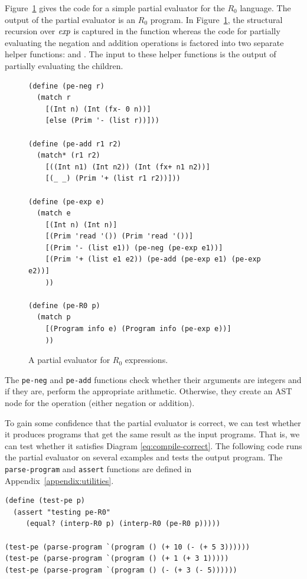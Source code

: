 \documentclass[11pt]{book}
\begin{document}
Figure~\ref{fig:pe-arith} gives the code for a simple partial
evaluator for the $R_0$ language. The output of the partial evaluator
is an $R_0$ program. In Figure~\ref{fig:pe-arith}, the structural
recursion over $\mathit{exp}$ is captured in the  function
whereas the code for partially evaluating the negation and addition
operations is factored into two separate helper functions:
 and . The input to these helper
functions is the output of partially evaluating the children.

\begin{figure}[tbp]
\begin{lstlisting}
(define (pe-neg r)
  (match r
    [(Int n) (Int (fx- 0 n))]
    [else (Prim '- (list r))]))

(define (pe-add r1 r2)
  (match* (r1 r2)
    [((Int n1) (Int n2)) (Int (fx+ n1 n2))]
    [(_ _) (Prim '+ (list r1 r2))]))

(define (pe-exp e)
  (match e
    [(Int n) (Int n)]
    [(Prim 'read '()) (Prim 'read '())]
    [(Prim '- (list e1)) (pe-neg (pe-exp e1))]
    [(Prim '+ (list e1 e2)) (pe-add (pe-exp e1) (pe-exp e2))]
    ))

(define (pe-R0 p)
  (match p
    [(Program info e) (Program info (pe-exp e))]
    ))
\end{lstlisting}
\caption{A partial evaluator for $R_0$ expressions.}
\label{fig:pe-arith}
\end{figure}

The \texttt{pe-neg} and \texttt{pe-add} functions check whether their
arguments are integers and if they are, perform the appropriate
arithmetic.  Otherwise, they create an AST node for the operation
(either negation or addition).

To gain some confidence that the partial evaluator is correct, we can
test whether it produces programs that get the same result as the
input programs. That is, we can test whether it satisfies Diagram
\eqref{eq:compile-correct}. The following code runs the partial
evaluator on several examples and tests the output program.  The
\texttt{parse-program} and \texttt{assert} functions are defined in
Appendix~\ref{appendix:utilities}.\\
\begin{minipage}{1.0\textwidth}
\begin{lstlisting}
(define (test-pe p)
  (assert "testing pe-R0"
     (equal? (interp-R0 p) (interp-R0 (pe-R0 p)))))

(test-pe (parse-program `(program () (+ 10 (- (+ 5 3))))))
(test-pe (parse-program `(program () (+ 1 (+ 3 1)))))
(test-pe (parse-program `(program () (- (+ 3 (- 5))))))
\end{lstlisting}
\end{minipage}
\end{document}
